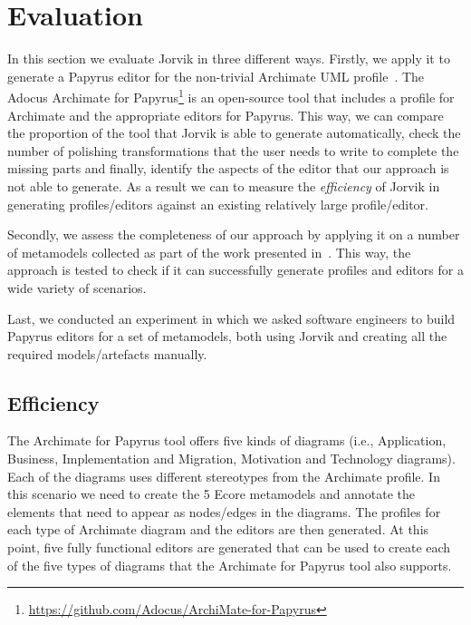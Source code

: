 \section{Evaluation}
\label{sec:evaluation}

In this section we evaluate Jorvik in three different ways. 
Firstly, we apply it to generate a Papyrus editor for the non-trivial Archimate UML profile~\cite{iacob2009archimate,haren2012archimate}. 
The Adocus Archimate for Papyrus\footnote{\url{https://github.com/Adocus/ArchiMate-for-Papyrus}} is an open-source tool that includes a profile for Archimate and the appropriate editors for Papyrus. 
This way, we can compare the proportion of the tool that Jorvik is able to generate automatically, check the number of polishing transformations that the user needs to write to complete the missing parts and finally, identify the aspects of the editor that our approach is not able to generate.
As a result we can to measure the \textit{efficiency} of Jorvik in generating profiles/editors against an existing relatively large profile/editor. 

Secondly, we assess the completeness of our approach by applying it on a number of metamodels collected as part of the work presented in~\cite{williams2013metamodels}. 
This way, the approach is tested to check if it can successfully generate profiles and editors for a wide variety of scenarios.

Last, we conducted an experiment in which we asked software engineers to build Papyrus editors for a set of metamodels, both using Jorvik and creating all the required models/artefacts manually.

\subsection{Efficiency}
\label{sec:efficiencyEvaluation}
The Archimate for Papyrus tool offers five kinds of diagrams (i.e., Application, Business, Implementation and Migration, Motivation and Technology diagrams). 
Each of the diagrams uses different stereotypes from the Archimate profile. 
In this scenario we need to create the 5 Ecore metamodels and annotate the elements that need to appear as nodes/edges in the diagrams. 
The profiles for each type of Archimate diagram and the editors are then generated. 
At this point, five fully functional editors are generated that can be used to create each of the five types of diagrams that the Archimate for Papyrus tool also supports. 

